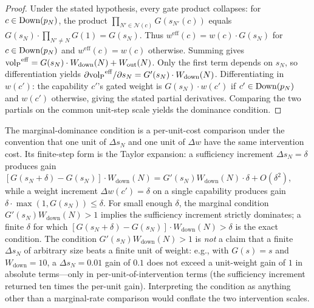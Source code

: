 \begin{proof}
Under the stated hypothesis, every gate product collapses: for
$c \in \mathrm{Down}(p_N)$, the product $\prod_{N' \in \mathcal{N}(c)}
G(s_{N'}(c))$ equals $G(s_N) \cdot \prod_{N' \neq N} G(1) =
G(s_N)$.  Thus
$w^{\mathrm{eff}}(c) = w(c) \cdot G(s_N)$ for
$c \in \mathrm{Down}(p_N)$ and $w^{\mathrm{eff}}(c) = w(c)$ otherwise.
Summing gives
${\operatorname{vol}_{\mathrm{P}}}^{\mathrm{eff}} = G(s_N) \cdot W_{\mathrm{down}}(N) +
W_{\mathrm{out}}(N)$.
Only the first term depends on $s_N$, so differentiation yields
$\partial {\operatorname{vol}_{\mathrm{P}}}^{\mathrm{eff}}/\partial s_N =
G'(s_N) \cdot W_{\mathrm{down}}(N)$.  Differentiating in
$w(c')$: the capability $c'$'s gated weight is $G(s_N) \cdot
w(c')$ if $c' \in \mathrm{Down}(p_N)$ and $w(c')$ otherwise, giving the
stated partial derivatives.  Comparing the two partials on the
common unit-step scale yields the dominance condition.
\end{proof}

\begin{remark}
\label{rem:dominance_scale}
The marginal-dominance condition is a per-unit-cost comparison
under the convention that one unit of $\Delta s_N$ and one unit
of $\Delta w$ have the same intervention cost.  Its finite-step
form is the Taylor expansion: a sufficiency increment
$\Delta s_N = \delta$ produces gain
$[G(s_N + \delta) - G(s_N)] \cdot W_{\mathrm{down}}(N) =
G'(s_N) W_{\mathrm{down}}(N) \cdot \delta + O(\delta^2)$, while
a weight increment $\Delta w(c') = \delta$ on a single
capability produces gain $\delta \cdot \max(1, G(s_N)) \leq
\delta$.  For small enough $\delta$, the marginal condition
$G'(s_N) W_{\mathrm{down}}(N) > 1$ implies the sufficiency
increment strictly dominates; a finite $\delta$ for which
$[G(s_N + \delta) - G(s_N)] \cdot W_{\mathrm{down}}(N) > \delta$
is the exact condition.  The condition
$G'(s_N) W_{\mathrm{down}}(N) > 1$ is \emph{not} a claim that a
finite $\Delta s_N$ of arbitrary size beats a finite unit of
weight: e.g., with $G(s) = s$ and $W_{\mathrm{down}} = 10$, a
$\Delta s_N = 0.01$ gain of $0.1$ does not exceed a
unit-weight gain of $1$ in absolute terms---only in
per-unit-of-intervention terms (the sufficiency increment
returned ten times the per-unit gain).  Interpreting the
condition as anything other than a marginal-rate comparison
would conflate the two intervention scales.
\end{remark}

